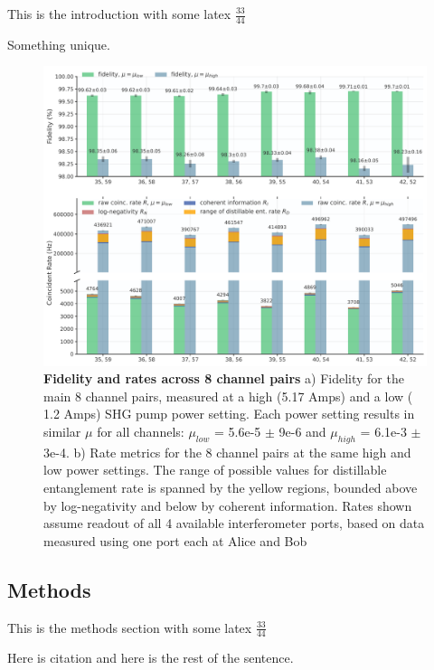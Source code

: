 \documentclass{optica-article}
\begin{document}
This is the introduction with some latex \(\frac{33}{44}\)

Something unique.

\hypertarget{fig:channel_data}{%
\begin{figure}
\centering
\includegraphics[width=1\textwidth,height=\textheight]{./figs_03/8ch_bar_graph_high_power_light.pdf}
\caption[{Fidelity and rates across 8 channel pairs.}]{\textbf{Fidelity and rates across 8 channel pairs} a) Fidelity for the main 8 channel pairs, measured at a high (5.17 Amps) and a low ( 1.2 Amps) SHG pump power setting. Each power setting results in similar \(\mu\) for all channels: \(\mu_{low}\) = 5.6e-5 \(\pm\) 9e-6 and \(\mu_{high}\) = 6.1e-3 \(\pm\) 3e-4. b) Rate metrics for the 8 channel pairs at the same high and low power settings. The range of possible values for distillable entanglement rate is spanned by the yellow regions, bounded above by log-negativity and below by coherent information. Rates shown assume readout of all 4 available interferometer ports, based on data measured using one port each at Alice and Bob}
\label{fig:channel_data}
\end{figure}
}

\hypertarget{methods}{%
\subsection{Methods}\label{methods}}

This is the methods section with some latex \(\frac{33}{44}\)

Here is citation \cite{Dolinar2011Photon} and here is the rest of the sentence.


\end{document}
